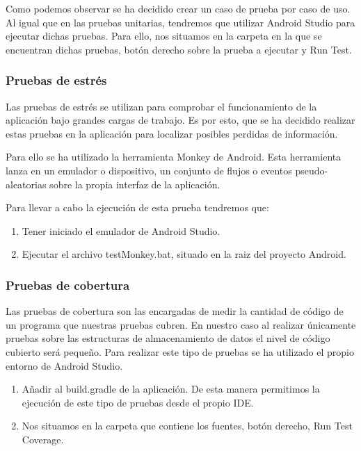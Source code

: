 
Como podemos observar se ha decidido crear un caso de prueba por caso de uso. Al igual que en las pruebas unitarias, tendremos que utilizar Android Studio para ejecutar dichas pruebas. Para ello,  nos situamos en la carpeta en la que se encuentran dichas pruebas, botón derecho sobre la prueba a ejecutar y Run Test.

\subsubsection{Pruebas de estrés}

Las pruebas de estrés se utilizan para comprobar el funcionamiento de la aplicación bajo grandes cargas de trabajo. Es por esto, que se ha decidido realizar estas pruebas en la aplicación para localizar posibles perdidas de información.

Para ello se ha utilizado la herramienta Monkey de Android. Esta herramienta lanza en un emulador o dispositivo, un conjunto de flujos o eventos pseudo-aleatorias sobre la propia interfaz de la aplicación.

Para llevar a cabo la ejecución de esta prueba tendremos que:

\begin{enumerate}
		\item Tener iniciado el emulador de Android Studio.
	
	\item Ejecutar el archivo testMonkey.bat, situado en la raiz del proyecto Android.

\end{enumerate}

\subsubsection{Pruebas de cobertura}

Las pruebas de cobertura son las encargadas de medir la cantidad de código de un programa que nuestras pruebas cubren. En nuestro caso al realizar únicamente pruebas sobre las estructuras de almacenamiento de datos el nivel de código cubierto será pequeño.
Para realizar este tipo de pruebas se ha utilizado el propio entorno de Android Studio.

\begin{enumerate}

	\item Añadir al build.gradle de la aplicación. 
	De esta manera permitimos la ejecución de este tipo de pruebas desde el propio IDE.
	\item Nos situamos en la carpeta que contiene los fuentes, botón derecho, Run Test Coverage.


\end{enumerate}


